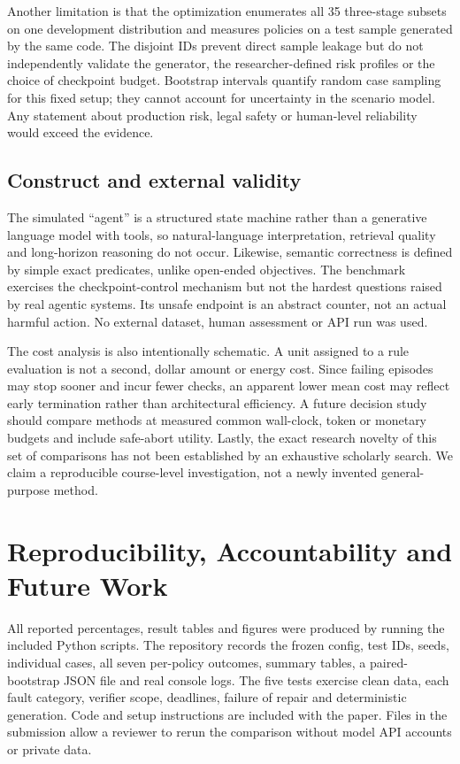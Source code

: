 \documentclass[conference]{IEEEtran}
\begin{document}
Another limitation is that the optimization enumerates all 35 three-stage subsets on one development distribution and measures policies on a test sample generated by the same code. The disjoint IDs prevent direct sample leakage but do not independently validate the generator, the researcher-defined risk profiles or the choice of checkpoint budget. Bootstrap intervals quantify random case sampling for this fixed setup; they cannot account for uncertainty in the scenario model. Any statement about production risk, legal safety or human-level reliability would exceed the evidence.

\subsection{Construct and external validity}
The simulated ``agent'' is a structured state machine rather than a generative language model with tools, so natural-language interpretation, retrieval quality and long-horizon reasoning do not occur. Likewise, semantic correctness is defined by simple exact predicates, unlike open-ended objectives. The benchmark exercises the checkpoint-control mechanism but not the hardest questions raised by real agentic systems. Its unsafe endpoint is an abstract counter, not an actual harmful action. No external dataset, human assessment or API run was used.

The cost analysis is also intentionally schematic. A unit assigned to a rule evaluation is not a second, dollar amount or energy cost. Since failing episodes may stop sooner and incur fewer checks, an apparent lower mean cost may reflect early termination rather than architectural efficiency. A future decision study should compare methods at measured common wall-clock, token or monetary budgets and include safe-abort utility. Lastly, the exact research novelty of this set of comparisons has not been established by an exhaustive scholarly search. We claim a reproducible course-level investigation, not a newly invented general-purpose method.

\section{Reproducibility, Accountability and Future Work}
All reported percentages, result tables and figures were produced by running the included Python scripts. The repository records the frozen config, test IDs, seeds, individual cases, all seven per-policy outcomes, summary tables, a paired-bootstrap JSON file and real console logs. The five tests exercise clean data, each fault category, verifier scope, deadlines, failure of repair and deterministic generation. Code and setup instructions are included with the paper. Files in the submission allow a reviewer to rerun the comparison without model API accounts or private data.
\end{document}
